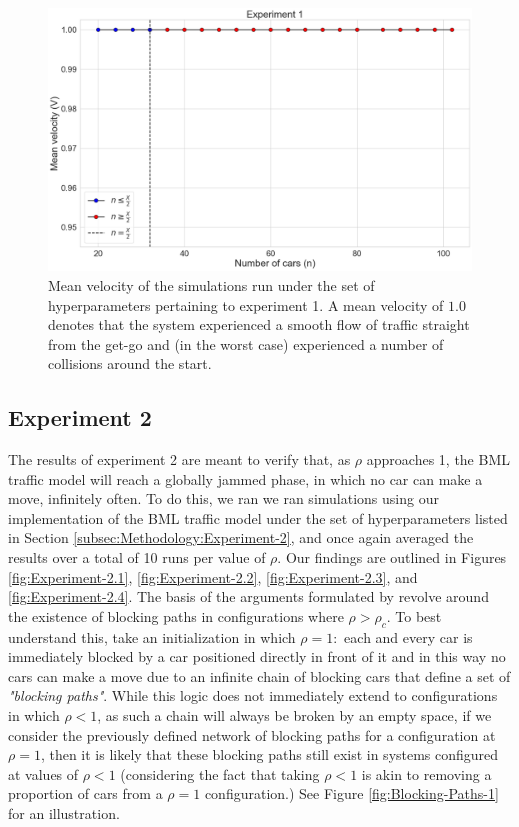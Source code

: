 \begin{figure}[H]
    \centering
    \includegraphics[width=\linewidth]{Images/Section 4/Experiment 1/1.2.pdf}
    \caption{Mean velocity of the simulations run under the set of hyperparameters pertaining to experiment 1. A mean velocity of $1.0$ denotes that the system experienced a smooth flow of traffic straight from the get-go and (in the worst case) experienced a number of collisions around the start.}
    \label{fig:Experiment-1.1}
\end{figure}

\subsection{Experiment 2}
\label{subsec:Results-and-Discussion:Experiment-2}
The results of experiment 2 are meant to verify that, as $\rho$ approaches 1, the BML traffic model will reach a globally jammed phase, in which no car can make a move, infinitely often. To do this, we ran we ran simulations using our implementation of the BML traffic model under the set of hyperparameters listed in Section \ref{subsec:Methodology:Experiment-2}, and once again averaged the results over a total of 10 runs per value of $\rho$. Our findings are outlined in Figures \ref{fig:Experiment-2.1}, \ref{fig:Experiment-2.2}, \ref{fig:Experiment-2.3}, and \ref{fig:Experiment-2.4}. The basis of the arguments formulated by \citeauthor{Omer} revolve around the existence of blocking paths in configurations where $\rho > \rho_c$. To best understand this, take an initialization in which $\rho = 1:$  each and every car is immediately blocked by a car positioned directly in front of it and in this way no cars can make a move due to an infinite chain of blocking cars that define a set of \textit{"blocking paths"}. While this logic does not immediately extend to configurations in which $\rho < 1$, as such a chain will always be broken by an empty space, if we consider the previously defined network of blocking paths for a configuration at $\rho = 1$, then it is likely that these blocking paths still exist in systems configured at values of $\rho < 1$ (considering the fact that taking $\rho < 1$ is akin to removing a proportion of cars from a $\rho = 1$ configuration.) See Figure \ref{fig:Blocking-Paths-1} for an illustration.

